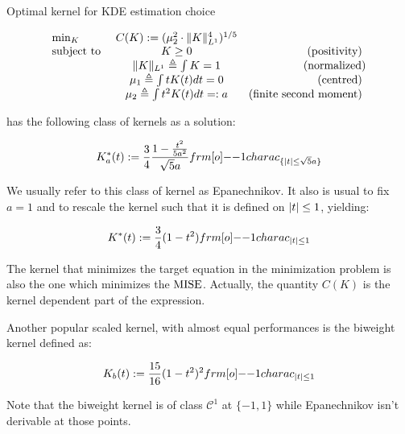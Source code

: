 \begin{theoreme}{Optimal kernel for KDE estimation choice}

\begin{equation}
\begin{array}{lcr}
\min_{ K  }  & C(K) := ( \mu_2 ^2 \cdot \lVert K\rVert_{L^1}^4 )^{1/5}      &     \\
\text{subject to }   & K \geq 0 & \text{(positivity) } \\
& \lVert K\rVert_{L^1} \triangleq  \int K = 1  & \text{(normalized)} \\
 & \mu_1 \triangleq  \int t K(t) dt = 0    & \text{(centred)                 } \\
& \mu_2 \triangleq  \int t^2 K(t) dt =: a         & \text{(finite second moment)   }           
\end{array}
\end{equation}

has the following class of kernels as a solution:

\begin{equation}
K^*_a(t) := \frac 3 4  \frac { 1 - \frac {t^2}{5 a^2} } {\sqrt{5} a } \11charac_{ \{ \abs t \leq \sqrt{5} a \} }
\end{equation} 

We usually refer to this class of kernel as Epanechnikov. It also is usual to fix $a=1$ and to rescale the kernel such that it is defined on $\lvert t\rvert \leq 1 $, yielding:


\begin{equation}
K^*(t) := \frac 3 4 ( 1 - t^2 )  \11charac_{ \abs t \leq 1 }
\end{equation} 
\end{theoreme} 

The kernel that minimizes the target equation in the minimization problem is also the one which minimizes the $\operatorname{MISE}$. Actually, the quantity $C(K)$ is the kernel dependent part of the expression. 

Another popular scaled kernel, with almost equal performances is the biweight kernel defined as:

\begin{equation}
K_b(t) := \frac {15}{16} ( 1 - t^2 )^2  \11charac_{ \abs t \leq 1 }
\end{equation} 

\begin{remarque}
Note that the biweight kernel is of class $\mathcal C^{1}$ at $\{-1, 1\}$ while Epanechnikov isn't derivable at those points.
\end{remarque}











